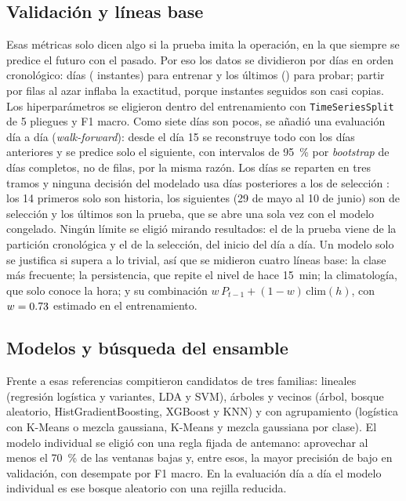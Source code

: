 \documentclass[conference]{IEEEtran}
\begin{document}
\subsection{Validaci\'on y l\'ineas base}
Esas m\'etricas solo dicen algo si la prueba imita la operaci\'on, en la que siempre se predice el futuro con el pasado. Por eso los datos se dividieron por d\'ias en orden cronol\'ogico: \ndiasentr{} d\'ias (\nentrena{} instantes) para entrenar y los \ndiasprueba{} \'ultimos (\nprueba{}) para probar; partir por filas al azar inflaba la exactitud, porque instantes seguidos son casi copias. Los hiperpar\'ametros se eligieron dentro del entrenamiento con \texttt{TimeSeriesSplit} de 5 pliegues y F1 macro. Como siete d\'ias son pocos, se a\~nadi\'o una evaluaci\'on d\'ia a d\'ia (\emph{walk-forward}): desde el d\'ia 15 se reconstruye todo con los d\'ias anteriores y se predice solo el siguiente, con intervalos de 95~\% por \emph{bootstrap} de d\'ias completos, no de filas, por la misma raz\'on. Los d\'ias se reparten en tres tramos y ninguna decisi\'on del modelado usa d\'ias posteriores a los de selecci\'on \cite{cawley,reforms}: los 14 primeros solo son historia, los \ndiassel{} siguientes (29 de mayo al 10 de junio) son de selecci\'on y los \ndiasprueba{} \'ultimos son la prueba, que se abre una sola vez con el modelo congelado. Ning\'un l\'imite se eligi\'o mirando resultados: el de la prueba viene de la partici\'on cronol\'ogica y el de la selecci\'on, del inicio del d\'ia a d\'ia. Un modelo solo se justifica si supera a lo trivial, as\'i que se midieron cuatro l\'ineas base: la clase m\'as frecuente; la persistencia, que repite el nivel de hace 15~min; la climatolog\'ia, que solo conoce la hora; y su combinaci\'on $w\,P_{t-1}+(1-w)\,\mathrm{clim}(h)$, con $w=0.73{}$ estimado en el entrenamiento.

\subsection{Modelos y b\'usqueda del ensamble}
Frente a esas referencias compitieron \ncandidatos{} candidatos de tres familias: lineales (regresi\'on log\'istica y variantes, LDA y SVM), \'arboles y vecinos (\'arbol, bosque aleatorio, HistGradientBoosting, XGBoost y KNN) y con agrupamiento (log\'istica con K-Means o mezcla gaussiana, K-Means y mezcla gaussiana por clase). El modelo individual se eligi\'o con una regla fijada de antemano: aprovechar al menos el 70~\% de las ventanas bajas y, entre esos, la mayor precisi\'on de bajo en validaci\'on, con desempate por F1 macro. En la evaluaci\'on d\'ia a d\'ia el modelo individual es ese bosque aleatorio con una rejilla reducida.
\end{document}
